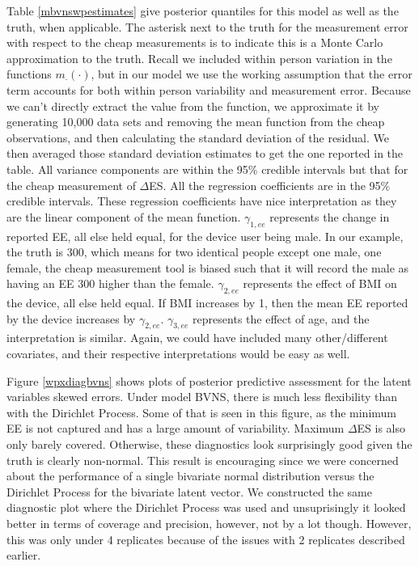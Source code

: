 \documentclass[11pt]{article}\usepackage[]{graphicx}\usepackage[]{color}
\begin{document}
Table  \ref{mbvnswpestimates} give posterior quantiles for this model as well as the truth, when applicable. The asterisk next to the truth for the measurement error with respect to the cheap measurements is to indicate this is a Monte Carlo approximation to the truth. Recall we included within person variation in the functions $m_{\cdot}(\cdot)$, but in our model we use the working assumption that the error term accounts for both within person variability and measurement error. Because we can't directly extract the value from the function, we approximate it by generating 10,000 data sets and removing the mean function from the cheap observations, and then calculating the standard deviation of the residual. We then averaged those standard deviation estimates to get the one reported in the table. All variance components are within the 95\% credible intervals but that for the cheap measurement of $\Delta$ES. All the regression coefficients are in the 95\% credible intervals. These regression coefficients have nice interpretation as they are the linear component of the mean function. $\gamma_{1,ee}$ represents the change in reported EE, all else held equal, for the device user being male. In our example, the truth is 300, which means for two identical people except one male, one female, the cheap measurement tool is biased such that it will record the male as having an EE 300 higher than the female. $\gamma_{2,ee}$ represents the effect of BMI on the device, all else held equal. If BMI increases by 1, then the mean EE reported by the device increases by $\gamma_{2,ee}$. $\gamma_{3,ee}$ represents the effect of age, and the interpretation is similar. Again, we could have included many other/different covariates, and their respective interpretations would be easy as well.

Figure  \ref{wpxdiagbvns} shows plots of posterior predictive assessment for the latent variables skewed errors. Under model BVNS, there is much less flexibility than with the Dirichlet Process. Some of that is seen in this figure, as the minimum EE is not captured and has a large amount of variability. Maximum $\Delta$ES is also only barely covered. Otherwise, these diagnostics look surprisingly good given the truth is clearly non-normal. This result is encouraging since we were concerned about the performance of a single bivariate normal distribution versus the Dirichlet Process for the bivariate latent vector. We constructed the same diagnostic plot where the Dirichlet Process was used and unsuprisingly it looked better in terms of coverage and precision, however, not by a lot though. However, this was only under 4 replicates because of the issues with 2 replicates described earlier. 
\end{document}
